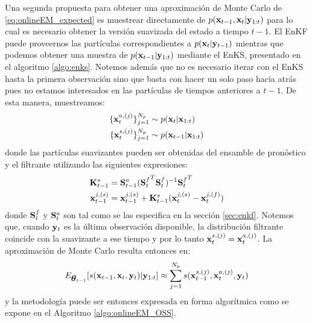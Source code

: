Una segunda propuesta para obtener una aproximación de Monte Carlo de \ref{eq:onlineEM_expected} es muestrear directamente de $p(\mathbf{x}_{t-1}, \mathbf{x}_t| \mathbf{y}_{1:t})$ para lo cual es necesario obtener la versión suavizada del estado a tiempo $t-1$. El EnKF puede proveernos las partículas correspondientes a $p(\mathbf{x}_t | \mathbf{y}_{t-1})$ mientras que podemos obtener una muestra de $p(\mathbf{x}_{t-1} | \mathbf{y}_{1:t})$ mediante el EnKS, presentado en el algoritmo \ref{algo:enks}. Notemos además que no es necesario iterar con el EnKS hasta la primera observación sino que basta con hacer un solo paso hacia atrás pues no estamos interesados en las partículas de tiempos anteriores a $t-1$. De esta manera, muestreamos:
\begin{align*}
    \{\mathbf{x}_t^{a, (j)}\}_{j=1}^{N_p} &\sim p(\mathbf{x}_t | \mathbf{x}_{1:t}) \\
    \{\mathbf{x}_t^{s, (j)}\}_{j=1}^{N_p} &\sim p(\mathbf{x}_{t-1} | \mathbf{x}_{1:t})
\end{align*}
donde las partículas suavizantes pueden ser obtenidas del ensamble de pronóstico y el filtrante utilizando las siguientes expresiones:
\begin{align*}
    \mathbf{K}_{t-1}^s &= \mathbf{S}_{t-1}^a ( {\mathbf{S}_t^f}^T \mathbf{S}_t^f )^{-1} {\mathbf{S}_t^f}^T \\
    \mathbf{x}_{t-1}^{j, (s)} &= \mathbf{x}_{t-1}^{j, (s)} + \mathbf{K}_{t-1}^s (\mathbf{x}_t^{j, (s)} - \mathbf{x}_t^{j, (f)})
\end{align*}
donde $\mathbf{S}_t^f$ y $\mathbf{S}_t^a$ son tal como se las especifica en la sección \ref{sec:enkf}. Notemos que, cuando $\mathbf{y}_t$ es la última observación disponible, la distribución filtrante coincide con la suavizante a ese tiempo y por lo tanto $\mathbf{x}_t^{s, (j)} = \mathbf{x}_t^{a, (j)}$. La aproximación de Monte Carlo resulta entonces en:
\begin{align*}
    E_{\mbox{\boldmath$ \theta $}_{t-1}} [s(\mathbf{x}_{t-1}, \mathbf{x}_t, \mathbf{y}_t) | \mathbf{y}_{1:t}] \approx \sum_{j=1}^{N_p} s(\mathbf{x}_{t-1}^{s, (j)}, \mathbf{x}_{t}^{a, (j)}, \mathbf{y}_t)
\end{align*}
y la metodología puede ser entonces expresada en forma algorítmica como se expone en el Algoritmo \ref{algo:onlineEM_OSS}.

